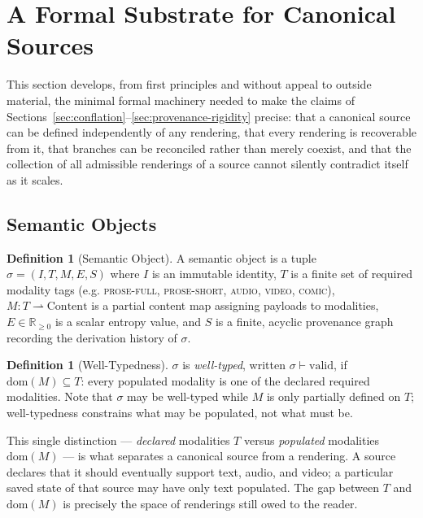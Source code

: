\documentclass[11pt]{article}
\theoremstyle{definition}
\newtheorem{definition}[theorem]{Definition}
\begin{document}
\section{A Formal Substrate for Canonical Sources}
\label{sec:formal-realization}

This section develops, from first principles and without appeal to outside material, the minimal formal machinery needed to make the claims of Sections~\ref{sec:conflation}--\ref{sec:provenance-rigidity} precise: that a canonical source can be defined independently of any rendering, that every rendering is recoverable from it, that branches can be reconciled rather than merely coexist, and that the collection of all admissible renderings of a source cannot silently contradict itself as it scales.

\subsection{Semantic Objects}

\begin{definition}[Semantic Object]
\label{def:semantic-object}
A semantic object is a tuple $\sigma = (I, T, M, E, S)$ where $I$ is an immutable identity, $T$ is a finite set of required modality tags (e.g. \textsc{prose-full}, \textsc{prose-short}, \textsc{audio}, \textsc{video}, \textsc{comic}), $M : T \rightharpoonup \mathrm{Content}$ is a partial content map assigning payloads to modalities, $E \in \mathbb{R}_{\geq 0}$ is a scalar entropy value, and $S$ is a finite, acyclic provenance graph recording the derivation history of $\sigma$.
\end{definition}

\begin{definition}[Well-Typedness]
\label{def:well-typed}
$\sigma$ is \emph{well-typed}, written $\sigma \vdash \mathrm{valid}$, if $\mathrm{dom}(M) \subseteq T$: every populated modality is one of the declared required modalities. Note that $\sigma$ may be well-typed while $M$ is only partially defined on $T$; well-typedness constrains what may be populated, not what must be.
\end{definition}

This single distinction --- \emph{declared} modalities $T$ versus \emph{populated} modalities $\mathrm{dom}(M)$ --- is what separates a canonical source from a rendering. A source declares that it should eventually support text, audio, and video; a particular saved state of that source may have only text populated. The gap between $T$ and $\mathrm{dom}(M)$ is precisely the space of renderings still owed to the reader.
\end{document}
